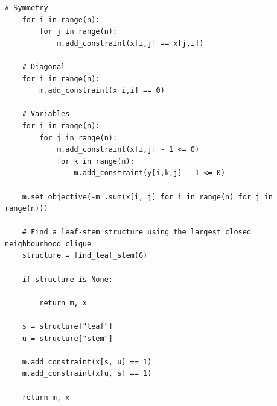 \begin{lstlisting}[style=python, caption={Unicliqual Vertex Linear Program.}, label={lst::unicliqaul_vertex_linear_program}]
    # Symmetry
    for i in range(n):
        for j in range(n):
            m.add_constraint(x[i,j] == x[j,i])

    # Diagonal
    for i in range(n):
        m.add_constraint(x[i,i] == 0)

    # Variables
    for i in range(n):
        for j in range(n):
            m.add_constraint(x[i,j] - 1 <= 0)
            for k in range(n):
                m.add_constraint(y[i,k,j] - 1 <= 0)

    m.set_objective(-m .sum(x[i, j] for i in range(n) for j in range(n)))

    # Find a leaf-stem structure using the largest closed neighbourhood clique
    structure = find_leaf_stem(G)

    if structure is None:

        return m, x

    s = structure["leaf"]
    u = structure["stem"]

    m.add_constraint(x[s, u] == 1)
    m.add_constraint(x[u, s] == 1)

    return m, x
\end{lstlisting}

